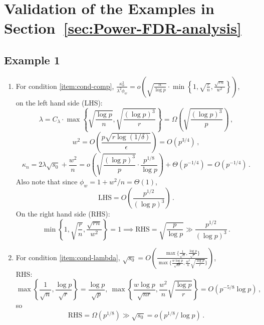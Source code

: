 \documentclass[11pt]{article}
\begin{document}
\section{Validation of the Examples in Section~\ref{sec:Power-FDR-analysis}}\label{pf:examples}

\subsection{Example 1}
\begin{enumerate}
\item  For condition \ref{item:cond-comp}, $\frac{\kappa_n^2}{\lambda^2\phi_w}=o\left(\sqrt{\frac{n}{\log p}}\cdot\min\left\{1,\sqrt{\frac{r}{n}},\frac{\sqrt{rn}}{w^2}\right\}\right)$,\\
on the left hand side (LHS):
\[
\lambda = C_\lambda\cdot\max\left\{\sqrt{\frac{\log p}{n}},\sqrt{\frac{(\log p)^3}{r}}\right\}=\Omega\left(\sqrt{\frac{(\log p)^3}{p}}\right)\,,
\]
\[w^2=O\left(\frac{p\sqrt{r\log(1/\delta)}}{\epsilon}\right)=O(p^{3/4})\,,
\]
\[
\kappa_n = 2\lambda\sqrt{s_0}+\frac{w^2}{n}=o\left(\sqrt{\frac{(\log p)^3}{p}}\cdot\frac{p^{1/8}}{\log p}\right)+\Theta\left(p^{-1/4}\right)=O\left(p^{-1/4}\right)\,.
\]
Also note that since $\phi_w = 1+w^2/n=\Theta(1)$, 
\[
\mbox{LHS} = O\left(\frac{p^{1/2}}{(\log p)^3}\right)\,.
\]
On the right hand side (RHS):
\[
\min\left\{1,\sqrt{\frac{r}{n}},\frac{\sqrt{rn}}{w^2}\right\} = 1 \implies \mbox{RHS} = \sqrt{\frac{p}{\log p}}\gg \frac{p^{1/2}}{(\log p)^3}\,.
\]
\item For condition \ref{item:cond-lambda}, $\sqrt{s_0} = O\left(\frac{\max\big\{\frac{1}{\sqrt{n}},\frac{\log p }{\sqrt{r}}\big\}}{\max\big\{\frac{w\log p}{\sqrt{nr}},\frac{w^2}{n}\sqrt{\frac{\log p}{r}}\big\}}\right)$,\\
RHS:
\[
\max\left\{\frac{1}{\sqrt{n}},\frac{\log p}{\sqrt{r}}\right\}=\frac{\log p}{\sqrt{p}},\ \max\left\{\frac{w\log p}{\sqrt{nr}},\frac{w^2}{n}\sqrt{\frac{\log p}{r}}\right\}=O\left(p^{-5/8}\log p\right)\,,
\]
so
\[
\mbox{RHS}=\Omega(p^{1/8})\gg\sqrt{s_0}=o(p^{1/8}/\log p)\,.
\]


\end{enumerate}
\end{document}
